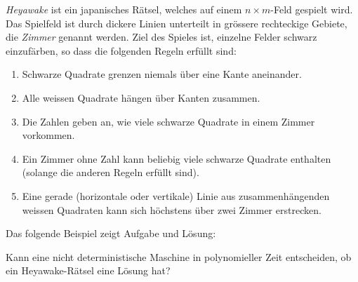 {\em Heyawake} ist ein japanisches Rätsel, welches auf einem $n\times m$-Feld
gespielt wird. Das Spielfeld ist durch dickere Linien unterteilt in grössere rechteckige Gebiete, die {\it Zimmer} genannt werden. 
Ziel des Spieles ist, einzelne Felder schwarz einzufärben, so dass die
folgenden Regeln erfüllt sind:
\begin{enumerate}
\item
Schwarze Quadrate grenzen niemals über eine Kante aneinander.
\item
Alle weissen Quadrate hängen über Kanten zusammen.
\item
Die Zahlen geben an, wie viele schwarze Quadrate in einem Zimmer vorkommen.
\item
Ein Zimmer ohne Zahl kann beliebig viele schwarze Quadrate enthalten
(solange die anderen Regeln erfüllt sind).
\item
Eine gerade (horizontale oder vertikale) Linie aus zusammenhängenden
weissen Quadraten kann sich höchstens über zwei Zimmer erstrecken.
\end{enumerate}
Das folgende Beispiel zeigt Aufgabe und Lösung:
\begin{center}
\qquad
{}
\end{center}

Kann eine nicht deterministische Maschine in polynomieller Zeit entscheiden,
ob ein Heyawake-Rätsel eine Lösung hat?

